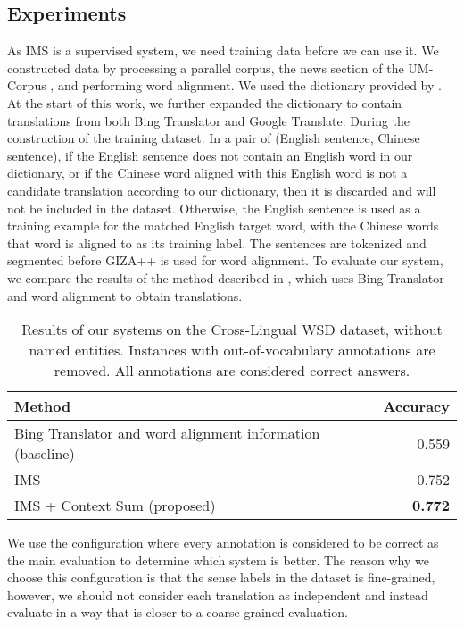 {\subsection{Experiments}

As IMS is a supervised system, we need  training data before we can use it. We constructed data by processing a parallel corpus, the news section of the UM-Corpus \cite{tian2014corpus}, and performing word alignment. We used the dictionary provided by \cite{tao2014}. At the start of this work, we further expanded the dictionary to contain translations from both Bing Translator and Google Translate. During the construction of the training dataset. In a pair of (English sentence, Chinese sentence), if the English sentence does not contain an English word in our dictionary, or if the Chinese word aligned with this English word is not a candidate translation according to our dictionary, then it is discarded and will not be included in the dataset. Otherwise, the English sentence is used as a training example for the matched English target word, with the Chinese words that word is aligned to as its training label. The sentences are tokenized and segmented before GIZA++ \cite {och03} is used for word alignment. To evaluate our system, we compare the results of the method described in \cite{tao2014}, which uses Bing Translator and word alignment to obtain translations.


\begin{table}[ht]
	\caption{Results of our systems on the Cross-Lingual WSD dataset, without named entities. Instances with out-of-vocabulary annotations are removed. All annotations are considered correct answers.}
	\label{table:CLWSD-test-results}
	\begin{center}

			\begin{tabular}{| p{9cm}| r| }
				\hline
				Method & Accuracy \\
				\hline
				Bing Translator and 
                word alignment information (baseline) & 0.559  \\
				\hline
				IMS & 0.752  \\
				\hline
				IMS + Context Sum (proposed) & {\bf 0.772}  \\
				\hline
			\end{tabular}

	\end{center}
\end{table}

We use the configuration where every annotation is considered to be correct as the main evaluation to determine which system is better. The reason why we choose this configuration is that the sense labels in the dataset is fine-grained, however, we should not consider each translation as independent and instead evaluate in a way that is closer to a coarse-grained evaluation. 

}
